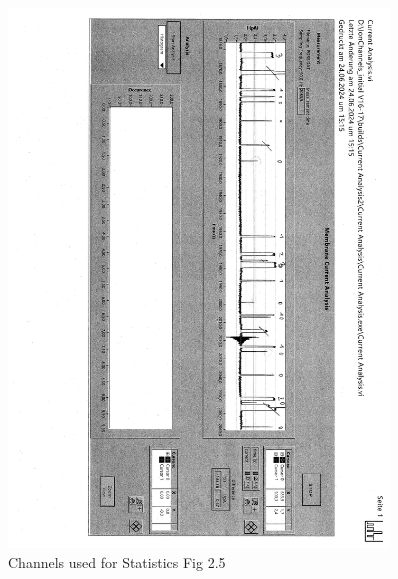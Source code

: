 \documentclass[a4paper,english,12pt,bibliography=totoc]{scrreprt}
\begin{document}
\begin{figure}[H]
    \centering
    \includegraphics[angle=90,width = 0.9\textwidth]{Analysis/ilovepdf_pages-to-jpg/doc00131020240719122038-1_page-0002.jpg}
    \caption{Channels used for Statistics Fig 2.5}
    \label{fig:enter-label}
\end{figure}
\end{document}
